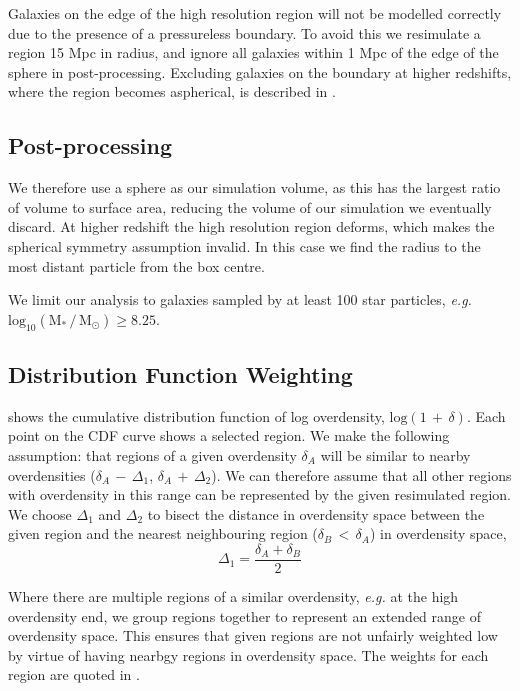 Galaxies on the edge of the high resolution region will not be modelled correctly due to the presence of a pressureless boundary.
To avoid this we resimulate a region 15 Mpc in radius, and ignore all galaxies within 1 Mpc of the edge of the sphere in post-processing.
Excluding galaxies on the boundary at higher redshifts, where the region becomes aspherical, is described in .

\subsection{Post-processing}
\label{sec:post_proc}



We therefore use a sphere as our simulation volume, as this has the largest ratio of volume to surface area, reducing the volume of our simulation we eventually discard.
At higher redshift the high resolution region deforms, which makes the spherical symmetry assumption invalid.
In this case we find the radius to the most distant particle from the box centre.


We limit our analysis to galaxies sampled by at least 100 star particles, \textit{e.g.} $\mathrm{log_{10}(M_{*}\,/\,M_{\odot})} \geqslant 8.25$.


\subsection{Distribution Function Weighting}

 shows the cumulative distribution function of log overdensity, $\mathrm{log}(1 \,+\, \delta)$.
Each point on the CDF curve shows a selected region.
We make the following assumption: that regions of a given overdensity $\delta_{A}$ will be similar to nearby overdensities ($\delta_{A}\,-\, \Delta_{1}$, $\delta_{A}\,+\, \Delta_{2}$).
We can therefore assume that all other regions with overdensity in this range can be represented by the given resimulated region.
We choose $\Delta_{1}$ and $\Delta_{2}$ to bisect the distance in overdensity space between the given region and the nearest neighbouring region ($\delta_{B} \,<\, \delta_{A}$) in overdensity space,
\begin{equation}
	\Delta_{1} = \frac{\delta_{A} + \delta_{B}}{2}
\end{equation}


Where there are multiple regions of a similar overdensity, \textit{e.g.} at the high overdensity end, we group regions together to represent an extended range of overdensity space. This ensures that given regions are not unfairly weighted low by virtue of having nearbgy regions in overdensity space.
The weights for each region are quoted in .
